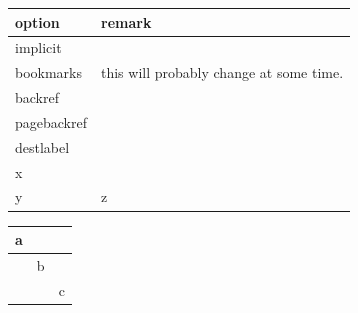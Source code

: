 \documentclass{article}
\begin{document}
\begin{tabular}{>{\ttfamily}l>{\raggedright\arraybackslash}p{5cm}}
option     & remark \\\hline
implicit   \\
bookmarks  & this will probably change at some time. \\
backref &\\
pagebackref & \\
destlabel  &\\[2pt]
x & \\*
y & z\\
\end{tabular}

\begin{tabular}{|l|c|r|}
a & & \\
\hline
& b & \\
& & c\\\hline
\end{tabular}
\end{document}

